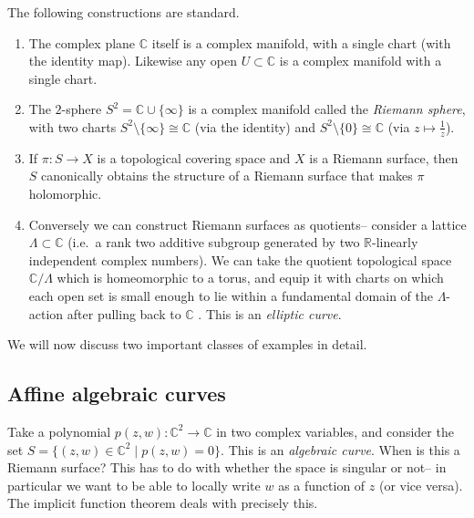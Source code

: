 \begin{example} The following constructions are standard.
    \begin{enumerate}
        \item The complex plane \(\mathbb{C}\) itself is a complex manifold,
            with a single chart (with the identity map). Likewise any open
            \(U\subset \mathbb{C}\) is a complex manifold with a single chart.

        \item  The \(2\)-sphere \(S^2=\mathbb{C}\cup \{\infty\}\) is a complex
            manifold called the \textit{Riemann sphere}, with two charts
            \(S^2\setminus \{\infty\} \cong \mathbb{C}\) (via the
            identity) and \(S^2\setminus \{0\}\cong \mathbb{C}\)
            (via \(z\mapsto \frac{1}{z}\)).

        \item If \(\pi:S\to X\) is a topological covering space and \(X\) is a
            Riemann surface, then \(S\) canonically obtains the structure of a
            Riemann surface that makes \(\pi\) holomorphic.

        \item Conversely we can construct Riemann surfaces as quotients--
            consider a lattice \(\Lambda \subset \mathbb{C}\) (i.e.\ a rank two
            additive subgroup generated by two \(\mathbb{R}\)-linearly
            independent complex numbers). We can take the quotient topological
            space \(\mathbb{C}/\Lambda\) which is homeomorphic to a torus, and
            equip it with charts on which each open set is small enough to lie
            within a fundamental domain of the \(\Lambda\)-action after pulling
            back to \(\mathbb{C}\) . This is an \textit{elliptic curve}.
    \end{enumerate}
\end{example}

We will now discuss two important classes of examples in detail.

\subsection{Affine algebraic curves}
Take a polynomial \(p(z,w):\mathbb{C}^2\to \mathbb{C}\) in two complex
variables, and consider the set \(S=\{(z,w)\in \mathbb{C}^2\;|\;
p(z,w)=0\}\). This is an \textit{algebraic curve}. When is this a Riemann
surface? This has to do with whether the space is singular or not-- in
particular we want to be able to locally write \(w\) as a function of \(z\) (or vice
versa). The implicit function theorem deals with precisely this.

